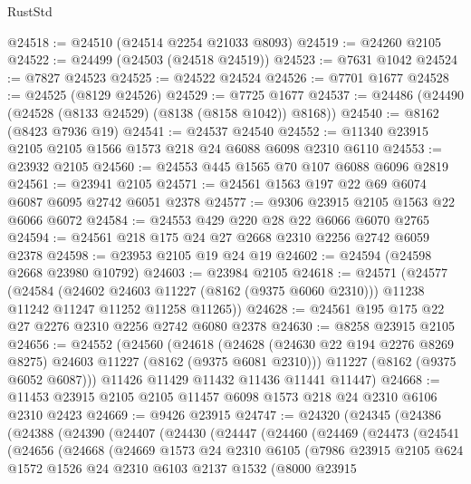 \begin{lexlean}{RustStd}
\begin{coremodule}
@24518 := @24510 (@24514 @2254 @21033 @8093)
@24519 := @24260 @2105
@24522 := @24499 (@24503 (@24518 @24519))
@24523 := @7631 @1042
@24524 := @7827 @24523
@24525 := @24522 @24524
@24526 := @7701 @1677
@24528 := @24525 (@8129 @24526)
@24529 := @7725 @1677
@24537 := @24486 (@24490 (@24528 (@8133 @24529) (@8138 (@8158 @1042)) @8168))
@24540 := @8162 (@8423 @7936 @19)
@24541 := @24537 @24540
@24552 := @11340 @23915 @2105 @2105 @1566 @1573 @218 @24 @6088 @6098 @2310 @6110
@24553 := @23932 @2105
@24560 := @24553 @445 @1565 @70 @107 @6088 @6096 @2819
@24561 := @23941 @2105
@24571 := @24561 @1563 @197 @22 @69 @6074 @6087 @6095 @2742 @6051 @2378
@24577 := @9306 @23915 @2105 @1563 @22 @6066 @6072
@24584 := @24553 @429 @220 @28 @22 @6066 @6070 @2765
@24594 := @24561 @218 @175 @24 @27 @2668 @2310 @2256 @2742 @6059 @2378
@24598 := @23953 @2105 @19 @24 @19
@24602 := @24594 (@24598 @2668 @23980 @10792)
@24603 := @23984 @2105
@24618 := @24571
    (@24577
      (@24584
        (@24602 @24603 @11227 (@8162 (@9375 @6060 @2310)))
        @11238
        @11242
        @11247
        @11252
        @11258
        @11265))
@24628 := @24561 @195 @175 @22 @27 @2276 @2310 @2256 @2742 @6080 @2378
@24630 := @8258 @23915 @2105
@24656 := @24552
    (@24560
      (@24618
        (@24628 (@24630 @22 @194 @2276 @8269 @8275) @24603 @11227 (@8162 (@9375 @6081 @2310)))
        @11227
        (@8162 (@9375 @6052 @6087)))
      @11426
      @11429
      @11432
      @11436
      @11441
      @11447)
@24668 := @11453 @23915 @2105 @2105 @11457 @6098 @1573 @218 @24 @2310 @6106 @2310 @2423
@24669 := @9426 @23915
@24747 := @24320
    (@24345
      (@24386
        (@24388
          (@24390
            (@24407
              (@24430
                (@24447
                  (@24460
                    (@24469
                      (@24473
                        (@24541
                          (@24656
                            (@24668
                              (@24669
                                @1573
                                @24
                                @2310
                                @6105
                                (@7986
                                  @23915
                                  @2105
                                  @624
                                  @1572
                                  @1526
                                  @24
                                  @2310
                                  @6103
                                  @2137
                                  @1532
                                  (@8000
                                    @23915

\end{coremodule}
\end{lexlean}

